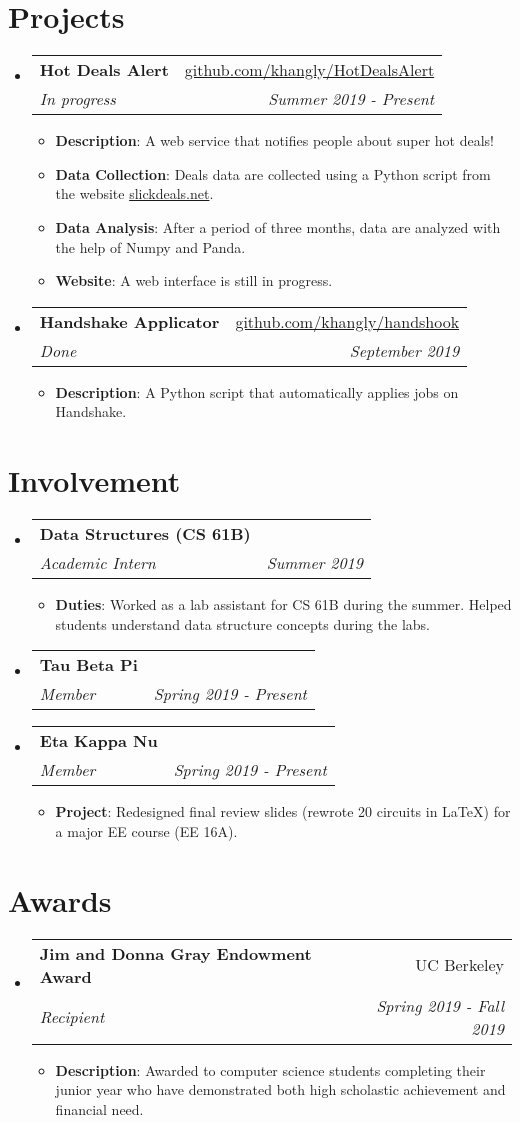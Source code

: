 \documentclass[letterpaper,11pt]{article}
\makeatletter
\newcommand{\resumeItem}[2]{
  \item\small{
    \textbf{#1}{: #2 \vspace{-2pt}}
  }
}
\newcommand{\resumeSubheading}[4]{
  \vspace{-1pt}\item
    \begin{tabular*}{0.97\textwidth}[t]{l@{\extracolsep{\fill}}r}
      \textbf{#1} & #2 \\
      \textit{\small#3} & \textit{\small #4} \\
    \end{tabular*}\vspace{-5pt}
}
\newcommand{\resumeSubHeadingListStart}{\begin{itemize}[leftmargin=*]}
\newcommand{\resumeSubHeadingListEnd}{\end{itemize}}
\newcommand{\resumeItemListStart}{\begin{itemize}}
\newcommand{\resumeItemListEnd}{\end{itemize}\vspace{-5pt}}
\makeatother
\begin{document}
\section{Projects}
  \resumeSubHeadingListStart
    \resumeSubheading
    	{Hot Deals Alert}{\href{https://github.com/khangly/HotDealsAlert}{github.com/khangly/HotDealsAlert}}
    	{In progress}{Summer 2019 - Present}
      \resumeItemListStart
        \resumeItem{Description}
          {A web service that notifies people about super hot deals!}
        \resumeItem{Data Collection}
          {Deals data are collected using a Python script from the website \href{https://slickdeals.net}{slickdeals.net}.}
        \resumeItem{Data Analysis}
          {After a period of three months, data are analyzed with the help of Numpy and Panda.}
        \resumeItem{Website}
          {A web interface is still in progress.}
      \resumeItemListEnd
    \resumeSubheading
    	{Handshake Applicator}{\href{https://github.com/khangly/handshook}{github.com/khangly/handshook}}
    	{Done}{September 2019}
      \resumeItemListStart
        \resumeItem{Description}
          {A Python script that automatically applies jobs on Handshake.}
      \resumeItemListEnd
  \resumeSubHeadingListEnd


\section{Involvement}
  \resumeSubHeadingListStart
    \resumeSubheading
      {Data Structures (CS 61B)}{}
      {Academic Intern}{Summer 2019}
      \resumeItemListStart
        \resumeItem{Duties}
          {Worked as a lab assistant for CS 61B during the summer. Helped students understand data structure concepts during the labs.}
      \resumeItemListEnd
    \resumeSubheading
      {Tau Beta Pi}{}
      {Member}{Spring 2019 - Present}
    \resumeSubheading
      {Eta Kappa Nu}{}
      {Member}{Spring 2019 - Present}
      \resumeItemListStart
        \resumeItem{Project}
          {Redesigned final review slides (rewrote 20 circuits in LaTeX) for a major EE course (EE 16A).}
      \resumeItemListEnd
  \resumeSubHeadingListEnd


\section{Awards}
  \resumeSubHeadingListStart
    \resumeSubheading
      {Jim and Donna Gray Endowment Award}{UC Berkeley}
      {Recipient}{Spring 2019 - Fall 2019}
      \resumeItemListStart
        \resumeItem{Description}
          {Awarded to computer science students completing their junior year who have demonstrated both high scholastic achievement and financial need.}
      \resumeItemListEnd
  \resumeSubHeadingListEnd
\end{document}
